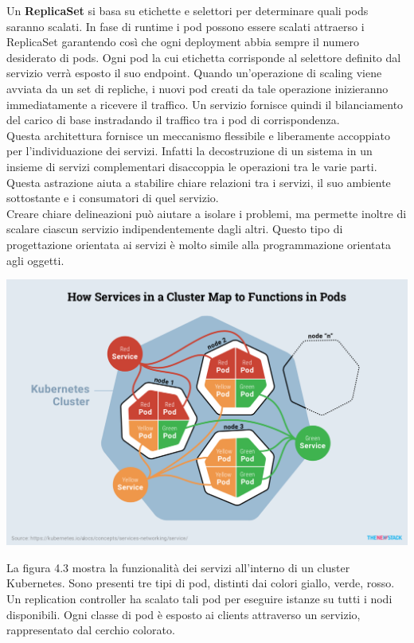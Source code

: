 \documentclass[12pt, a4paper]{report}
\begin{document}
Un \textbf{ReplicaSet} si basa su etichette e selettori per determinare quali pods saranno scalati. In fase di runtime i pod possono essere scalati attraerso i ReplicaSet garantendo così che ogni deployment abbia sempre il numero desiderato di pods. Ogni pod la cui etichetta corrisponde al selettore definito dal servizio verrà esposto il suo endpoint. Quando un'operazione di scaling viene avviata da un set di repliche, i nuovi pod creati da tale operazione inizieranno immediatamente a ricevere il traffico. Un servizio fornisce quindi il bilanciamento del carico di base instradando il traffico tra i pod di corrispondenza.
\\
Questa architettura fornisce un meccanismo flessibile e liberamente accoppiato per l'individuazione dei servizi. Infatti la decostruzione di un sistema in un insieme di servizi complementari disaccoppia le operazioni tra le varie parti. Questa astrazione aiuta a stabilire chiare relazioni tra i servizi, il suo ambiente sottostante e i consumatori di quel servizio.\\
Creare chiare delineazioni può aiutare a isolare i problemi, ma permette inoltre di scalare ciascun servizio indipendentemente dagli altri. Questo tipo di progettazione orientata ai servizi è molto simile alla programmazione orientata agli oggetti.
\begin{center}
  \includegraphics[width=\linewidth]{Images/Kubernetes-service}
\end{center}
La figura 4.3 mostra la funzionalità dei servizi all'interno di un cluster Kubernetes. Sono presenti tre tipi di pod, distinti dai colori giallo, verde, rosso. Un replication controller ha scalato tali pod per eseguire istanze su tutti i nodi disponibili. Ogni classe di pod è esposto ai clients attraverso un servizio, rappresentato dal cerchio colorato.\\
\end{document}
